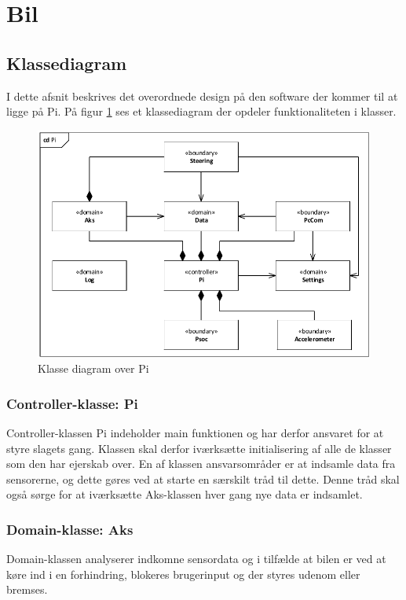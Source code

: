 \section{Bil} \label{sec:bil}

\subsection{Klassediagram}
I dette afsnit beskrives det overordnede design på den software der kommer til at ligge på Pi. På figur \ref{fig:cd_pi} ses et klassediagram der opdeler funktionaliteten i klasser.

\begin{figure}[h]
\centering
\includegraphics[width=\textwidth* 9/10]{../fig/diagrammer/bil/cd_pi.pdf}
\caption{Klasse diagram over Pi}
\label{fig:cd_pi}
\end{figure}

\subsubsection{Controller-klasse: Pi}
Controller-klassen Pi indeholder main funktionen og har derfor ansvaret for at styre slagets gang. Klassen skal derfor iværksætte initialisering af alle de klasser som den har ejerskab over. En af klassen ansvarsområder er at indsamle data fra sensorerne, og dette gøres ved at starte en særskilt tråd til dette. Denne tråd skal også sørge for at iværksætte Aks-klassen hver gang nye data er indsamlet.

\subsubsection{Domain-klasse: Aks}
Domain-klassen analyserer indkomne sensordata og i tilfælde at bilen er ved at køre ind i en forhindring, blokeres brugerinput og der styres udenom eller bremses.

